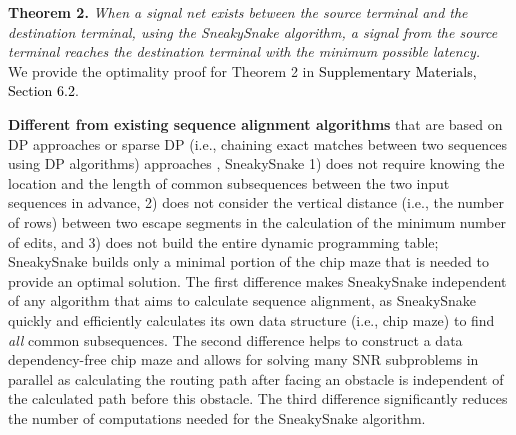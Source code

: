 \textbf{Theorem 2.} \emph{When a signal net exists between the source terminal and the destination terminal, using the SneakySnake algorithm, a signal from the source terminal reaches the destination terminal with the minimum possible latency.\\}
We provide the optimality proof for Theorem 2 in \textcolor{black}{Supplementary Materials, Section 6.2}.
\\\vspace{-10 pt}

{\textbf{Different from existing sequence alignment algorithms} that are based on DP approaches} \citep{daily2016parasail, xin2013accelerating} or sparse DP (i.e., chaining exact matches between two sequences using DP algorithms) approaches \citep{chaisson2012mapping}, 
{SneakySnake 1) does not require knowing the location and the length of {common subsequences} between the two {input} sequences in advance, 2) does not consider the vertical distance (i.e., the number of rows) between two escape segments in the calculation of the minimum number of edits, and 3) does not build the entire dynamic programming table; SneakySnake builds only a minimal portion of the chip maze that is needed to provide an optimal solution.
The first difference makes SneakySnake independent of any algorithm that aims to calculate sequence alignment, as SneakySnake quickly and efficiently calculates its own data structure (i.e., chip maze) to find \emph{all} {common subsequences}. {The second difference helps {to construct} a data dependency-free chip maze and allows for solving many SNR subproblems in parallel as calculating the routing path after facing an obstacle is independent of the calculated path before this obstacle.}
The third difference significantly reduces the number of computations needed for the SneakySnake algorithm.}

